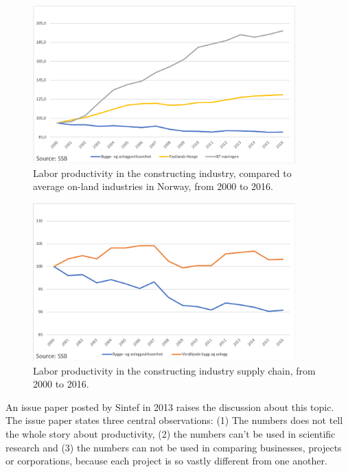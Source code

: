 \begin{figure}
    \centering
    \includegraphics[width=0.9\textwidth]{fig/ba_on-land_ICT.png}
    \caption{Labor productivity in the constructing industry, compared to average on-land industries in Norway, from 2000 to 2016.}
    \label{fig:productivity-comparing}
\end{figure}

\begin{figure}
    \centering
    \includegraphics[width=0.9\textwidth]{fig/ba_value_chain.png}
    \caption{Labor productivity in the constructing industry supply chain, from 2000 to 2016.}
    \label{fig:LP_supply_chain}
\end{figure}

An issue paper \cite{langlo2013maaling} posted by Sintef in 2013 raises the discussion about this topic. The issue paper states three central observations: (1) The numbers does not tell the whole story about productivity, (2) the numbers can’t be used in scientific research and (3) the numbers can not be used in comparing businesses, projects or corporations, because each project is so vastly different from one another. 

